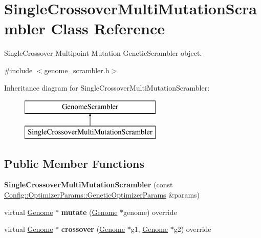 \hypertarget{class_single_crossover_multi_mutation_scrambler}{}\section{Single\+Crossover\+Multi\+Mutation\+Scrambler Class Reference}
\label{class_single_crossover_multi_mutation_scrambler}


Single\+Crossover Multipoint Mutation Genetic\+Scrambler object.  




{\ttfamily \#include $<$genome\+\_\+scrambler.\+h$>$}

Inheritance diagram for Single\+Crossover\+Multi\+Mutation\+Scrambler\+:\begin{figure}[H]
\begin{center}
\leavevmode
\includegraphics[height=2.000000cm]{class_single_crossover_multi_mutation_scrambler}
\end{center}
\end{figure}
\subsection*{Public Member Functions}
\begin{DoxyCompactItemize}
\item 
\mbox{\label{class_single_crossover_multi_mutation_scrambler_a0629f2305032d65c64671169541393f9}} 
{\bfseries Single\+Crossover\+Multi\+Mutation\+Scrambler} (const \hyperlink{struct_config_1_1_optimizer_params_1_1_genetic_optimizer_params}{Config\+::\+Optimizer\+Params\+::\+Genetic\+Optimizer\+Params} \&params)
\item 
\mbox{\label{class_single_crossover_multi_mutation_scrambler_a7fb49db4b002ff8572fa4cb2647963e4}} 
virtual \hyperlink{class_genome}{Genome} $\ast$ {\bfseries mutate} (\hyperlink{class_genome}{Genome} $\ast$genome) override
\item 
\mbox{\label{class_single_crossover_multi_mutation_scrambler_a3206ec862eb5d48c5aacb1cbe50fdcf1}} 
virtual \hyperlink{class_genome}{Genome} $\ast$ {\bfseries crossover} (\hyperlink{class_genome}{Genome} $\ast$g1, \hyperlink{class_genome}{Genome} $\ast$g2) override
\end{DoxyCompactItemize}



